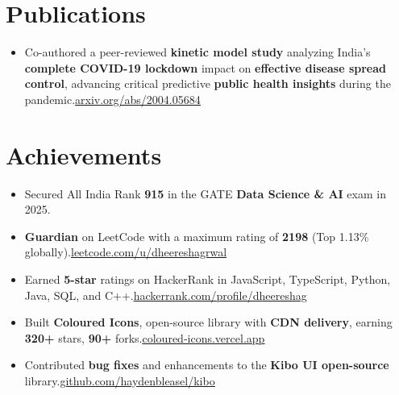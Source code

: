 \documentclass[letterpaper, 10pt]{article}
\newcommand{\myhref}[2]{\href{#1}{\color{accent}\underline{#2}}}
\newcommand{\bi}[1]{\item\small #1}
\begin{document}
\section{Publications}

\begin{itemize}
  \bi{Co-authored a peer-reviewed \textbf{kinetic model study} analyzing India's \textbf{complete COVID-19 lockdown} impact on \textbf{effective disease spread control}, advancing critical predictive \textbf{public health insights} during the pandemic.\hfill\myhref{https://arxiv.org/abs/2004.05684}{arxiv.org/abs/2004.05684}}
\end{itemize}

\section{Achievements}

\begin{itemize}
  \bi{Secured All India Rank \textbf{915} in the GATE \textbf{Data Science \& AI} exam in 2025.}
  \bi{\textbf{Guardian} on LeetCode with a maximum rating of \textbf{2198} (Top 1.13\% globally).\hfill\myhref{https://leetcode.com/u/dheereshagrwal}{leetcode.com/u/dheereshagrwal}}
  \bi{Earned \textbf{5-star} ratings on HackerRank in JavaScript, TypeScript, Python, Java, SQL, and C++.\hfill\myhref{https://www.hackerrank.com/profile/dheereshag}{hackerrank.com/profile/dheereshag}}
  \bi{Built \textbf{Coloured Icons}, open-source library with \textbf{CDN delivery}, earning \textbf{320+} stars, \textbf{90+} forks.\hfill\myhref{https://coloured-icons.vercel.app}{coloured-icons.vercel.app}}
  \bi{Contributed \textbf{bug fixes} and enhancements to the \textbf{Kibo UI open-source} library.\hfill\myhref{https://github.com/haydenbleasel/kibo/issues/182}{github.com/haydenbleasel/kibo}}
\end{itemize}
\end{document}
